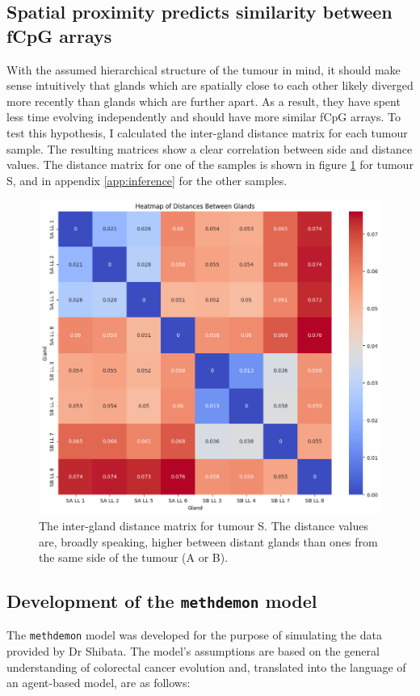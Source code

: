 \subsection{Spatial proximity predicts similarity between fCpG arrays}
With the assumed hierarchical structure of the tumour in mind, it should make
sense intuitively that glands which are spatially close to each other likely
diverged more recently than glands which are further apart. As a result, they
have spent less time evolving independently and should have more similar fCpG
arrays. To test this hypothesis, I calculated the inter-gland distance matrix
for each tumour sample. The resulting matrices show a clear correlation between
side and distance values. The distance matrix for one of the samples is shown
in figure \ref{fig:gland_dist_S} for tumour S, and in appendix
\ref{app:inference} for the other samples.

\begin{figure}[h]
    \centering
    \includegraphics[width=\textwidth]{Chapter_5/figures/gland_dist_S.png}
    \caption{The inter-gland distance matrix for tumour S. The distance values
    are, broadly speaking, higher between distant glands than ones from the same
    side of the tumour (A or B).}
    \label{fig:gland_dist_S}
\end{figure}

\subsection{Development of the \texttt{methdemon} model}
The \texttt{methdemon} model was developed for the purpose of simulating the
data provided by Dr Shibata. The model's assumptions are based on the general
understanding of colorectal cancer evolution and, translated into the language
of an agent-based model, are as follows:

